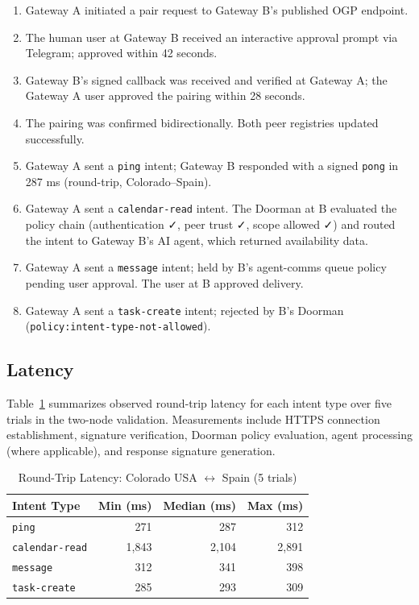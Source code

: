 \documentclass[conference]{IEEEtran}
\begin{document}
\begin{enumerate}
  \item Gateway A initiated a pair request to Gateway B's published OGP endpoint.
  \item The human user at Gateway B received an interactive approval prompt via Telegram; approved within 42 seconds.
  \item Gateway B's signed callback was received and verified at Gateway A; the Gateway A user approved the pairing within 28 seconds.
  \item The pairing was confirmed bidirectionally. Both peer registries updated successfully.
  \item Gateway A sent a \texttt{ping} intent; Gateway B responded with a signed \texttt{pong} in 287 ms (round-trip, Colorado--Spain).
  \item Gateway A sent a \texttt{calendar-read} intent. The Doorman at B evaluated the policy chain (authentication ✓, peer trust ✓, scope allowed ✓) and routed the intent to Gateway B's AI agent, which returned availability data.
  \item Gateway A sent a \texttt{message} intent; held by B's agent-comms queue policy pending user approval. The user at B approved delivery.
  \item Gateway A sent a \texttt{task-create} intent; rejected by B's Doorman (\texttt{policy:intent-type-not-allowed}).
\end{enumerate}

\subsection{Latency}

Table~\ref{tab:latency} summarizes observed round-trip latency for each intent type over five trials in the two-node validation. Measurements include HTTPS connection establishment, signature verification, Doorman policy evaluation, agent processing (where applicable), and response signature generation.

\begin{table}[htbp]
\caption{Round-Trip Latency: Colorado USA $\leftrightarrow$ Spain (5 trials)}
\label{tab:latency}
\centering
\begin{tabular}{lrrr}
\toprule
\textbf{Intent Type} & \textbf{Min (ms)} & \textbf{Median (ms)} & \textbf{Max (ms)} \\
\midrule
\texttt{ping}           & 271 & 287 & 312 \\
\texttt{calendar-read}  & 1{,}843 & 2{,}104 & 2{,}891 \\
\texttt{message}        & 312 & 341 & 398 \\
\texttt{task-create}    & 285 & 293 & 309 \\
\bottomrule
\end{tabular}
\end{table}
\end{document}
